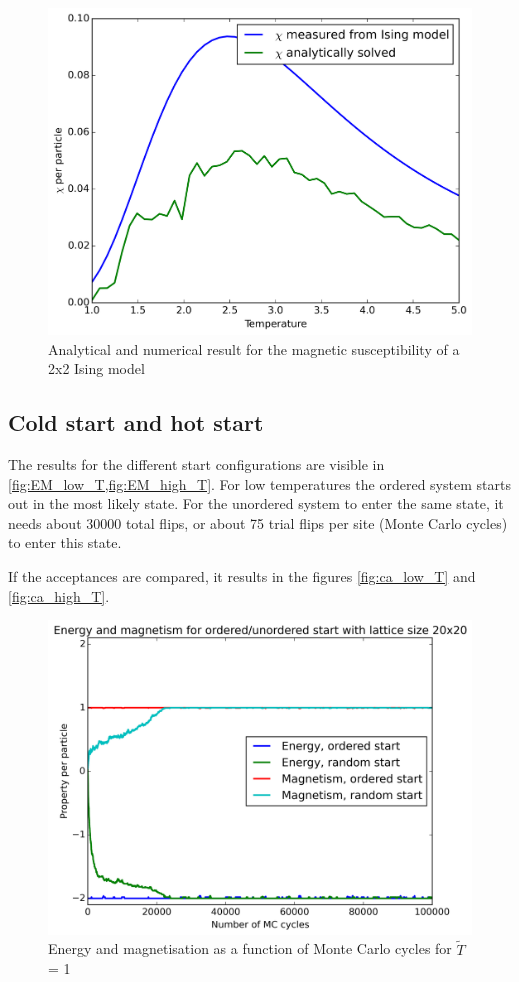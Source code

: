 \documentclass[11pt,a4paper,final]{article}
\numberwithin{equation}{section}
\newcommand{\figurewidth}{.85\textwidth}
\begin{document}
\begin{figure}
\centering
\includegraphics[width=\figurewidth]{pics/achi.png}
\caption{Analytical and numerical result for the magnetic susceptibility
of a 2x2 Ising model}
\label{fig:achi}
\end{figure}




\subsection{Cold start and hot start}

The results for the different start configurations are visible 
in \cref{fig:EM_low_T,fig:EM_high_T}. For low 
temperatures the ordered system starts out in the most likely state. For 
the unordered system to enter the same state, it needs about 30000 total 
flips, or about 75 trial flips per site (Monte Carlo cycles) 
to enter this state.

If the acceptances are compared, it 
results in the figures \ref{fig:ca_low_T} and \ref{fig:ca_high_T}.



\begin{figure}
\centering
\includegraphics[width=\figurewidth]{pics/cEM1.png}
\caption{Energy and magnetisation as a function of Monte Carlo cycles
for $\tilde{T}$ = 1}
\label{fig:EM_low_T}
\end{figure}
\end{document}
